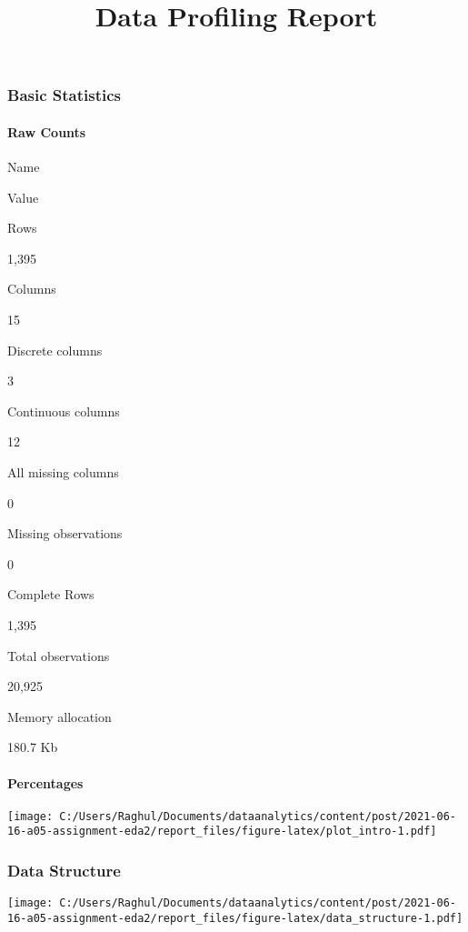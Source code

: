 \documentclass[
]{article}
\title{Data Profiling Report}
\author{}
\date{\vspace{-2.5em}}
\begin{document}
\maketitle

\hypertarget{basic-statistics}{%
\subsubsection{Basic Statistics}\label{basic-statistics}}

\hypertarget{raw-counts}{%
\paragraph{Raw Counts}\label{raw-counts}}

Name

Value

Rows

1,395

Columns

15

Discrete columns

3

Continuous columns

12

All missing columns

0

Missing observations

0

Complete Rows

1,395

Total observations

20,925

Memory allocation

180.7 Kb

\hypertarget{percentages}{%
\paragraph{Percentages}\label{percentages}}

\texttt{[image: C:/Users/Raghul/Documents/dataanalytics/content/post/2021-06-16-a05-assignment-eda2/report\_files/figure-latex/plot\_intro-1.pdf]}

\hypertarget{data-structure}{%
\subsubsection{Data Structure}\label{data-structure}}

\texttt{[image: C:/Users/Raghul/Documents/dataanalytics/content/post/2021-06-16-a05-assignment-eda2/report\_files/figure-latex/data\_structure-1.pdf]}
\end{document}
